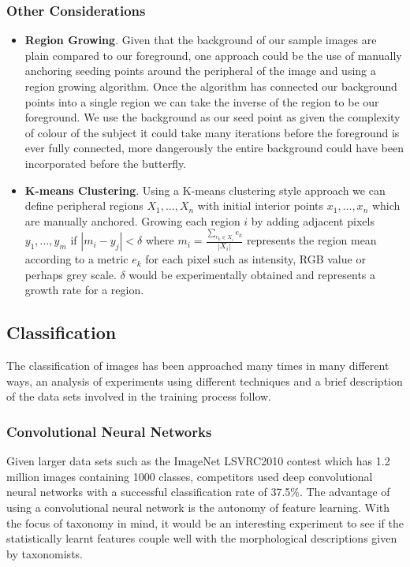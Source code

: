 \documentclass[11pt, titlepage, oneside]{article}
\theoremstyle{plain}
\theoremstyle{definition}
\theoremstyle{remark}
\begin{document}
		\subsubsection{Other Considerations}
			\begin{itemize}
				\item \textbf{Region Growing}. Given that the background of our sample images are plain compared to our foreground, one approach could be the use of  manually anchoring seeding points around the peripheral of the image and using a region growing algorithm. Once the algorithm has connected our background points into a single region we can take the inverse of the region to be our foreground. We use the background as our seed point as given the complexity of colour of the subject it could take many iterations before the foreground is ever fully connected, more dangerously the entire background could have been incorporated before the butterfly. 
				\item \textbf{K-means Clustering}. Using a K-means clustering style approach we can define peripheral regions $X_1,...,X_n$ with initial interior points $x_1,..., x_n$ which are manually anchored. Growing each region $i$ by adding adjacent pixels $y_1,...,y_m$ if $|m_i - y_j| < \delta$ where $\displaystyle m_i = \frac{\sum\limits_{e_k \in X_i} e_k}{|X_i|}$ represents the region mean according to a metric $e_k$ for each pixel such as intensity, RGB value or perhaps grey scale. $\delta$ would be experimentally obtained and represents a growth rate for a region.
			\end{itemize} 

	\subsection{Classification}
		The classification of images has been approached many times in many different ways, an analysis of experiments using different techniques and a brief description of the data sets involved in the training process follow.


		\subsubsection{Convolutional Neural Networks}
			Given larger data sets such as the ImageNet LSVRC2010 contest which has 1.2 million images containing 1000 classes\cite{imagenetsite}, competitors\cite{imagenet} used deep convolutional neural networks with a successful classification rate of 37.5\%. The advantage of using a convolutional neural network is the autonomy of feature learning. With the focus of taxonomy in mind, it would be an interesting experiment to see if the statistically learnt features couple well with the morphological descriptions given by taxonomists. \\
			
\end{document}
